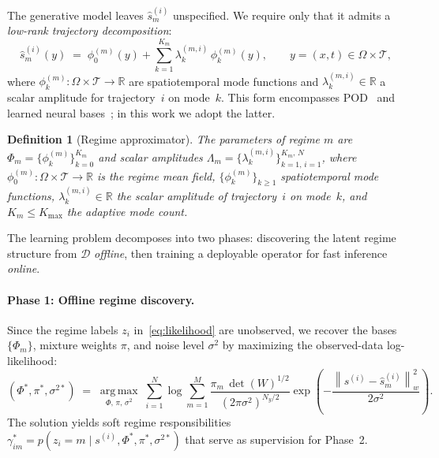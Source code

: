 \documentclass{article}
\newtheorem{definition}{Definition}
\newcommand{\cD}{\mathcal{D}}
\newcommand{\normsq}[1]{\left\|#1\right\|_w^{2}}
\newcommand{\hats}{\hat{s}}
\begin{document}
The generative model leaves $\hats_m^{(i)}$ unspecified. We require only that it admits a \emph{low-rank trajectory decomposition}:
\begin{equation}
  \hats_m^{(i)}(y)
  \;=\; \phi_0^{(m)}(y)
  + \sum_{k=1}^{K_m}
    \lambda_k^{(m,i)}\,\phi_k^{(m)}(y),
  \qquad y = (x,t) \in \Omega\times\mathcal{T},
  \label{eq:separable}
\end{equation}
where $\phi_k^{(m)} : \Omega\times\mathcal{T}\to\mathbb{R}$ are spatiotemporal
mode functions and $\lambda_k^{(m,i)} \in \mathbb{R}$ a scalar amplitude
for trajectory~$i$ on mode~$k$.
This form encompasses POD~\citep{Lu2022} and learned neural bases~\citep{Mou2026};
in this work we adopt the latter.

\begin{definition}[Regime approximator]
\label{def:approx}
The parameters of regime $m$ are
$\Phi_m = \{\phi_k^{(m)}\}_{k=0}^{K_m}$
and scalar amplitudes
$\Lambda_m = \{\lambda_k^{(m,i)}\}_{k=1,\,i=1}^{K_m,\,N}$,
where $\phi_0^{(m)} : \Omega\times\mathcal{T}\to\mathbb{R}$ is the regime mean field,
$\{\phi_k^{(m)}\}_{k \geq 1}$ spatiotemporal mode functions,
$\lambda_k^{(m,i)}\in\mathbb{R}$ the scalar amplitude of trajectory~$i$ on mode~$k$,
and $K_m \leq K_{\max}$ the adaptive mode count.
\end{definition}

The learning problem decomposes into two phases: discovering the latent regime structure from $\cD$ \emph{offline}, then training a deployable operator for fast inference \emph{online}.


\paragraph{Phase 1: Offline regime discovery.}

Since the regime labels $z_i$ in~\eqref{eq:likelihood} are unobserved,
we recover the bases $\{\Phi_m\}$, mixture weights $\pi$, and noise
level $\sigma^2$ by maximizing the observed-data log-likelihood:
\begin{equation}
  (\Phi^*,\pi^*,\sigma^{2*})
  \;=\; \operatorname*{arg\,max}_{\Phi,\,\pi,\,\sigma^2}
  \;\sum_{i=1}^N \log \sum_{m=1}^M
    \frac{\pi_m\,\det(W)^{1/2}}{(2\pi\sigma^2)^{N_y/2}}
    \exp\!\!\left(-\frac{\normsq{s^{(i)}-\hats_m^{(i)}}}{2\sigma^2}\right).
  \label{eq:mle}
\end{equation}
The solution yields soft regime responsibilities
$\gamma_{im}^* = p(z_i{=}m \mid s^{(i)},\Phi^*,\pi^*,\sigma^{2*})$
that serve as supervision for Phase~2.
\end{document}

